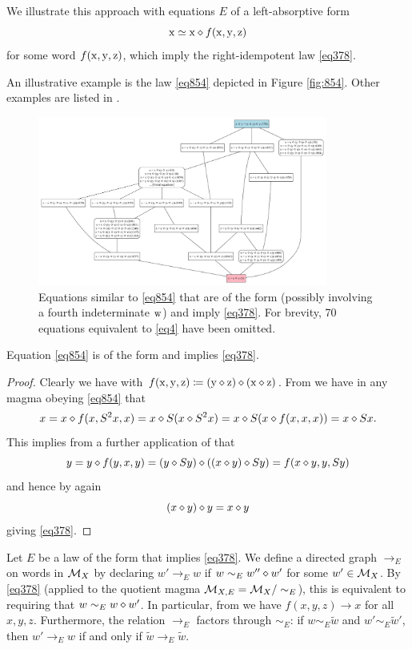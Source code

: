 We illustrate this approach with equations $E$ of a left-absorptive form
\begin{equation}\label{left-absorptive}
\mathrm{x} \simeq \mathrm{x} \diamond f(\mathrm{x},\mathrm{y},\mathrm{z})
\end{equation}
for some word $f(\mathrm{x},\mathrm{y},\mathrm{z})$, which imply the right-idempotent law \eqref{eq378}.

An illustrative example is the law \eqref{eq854} depicted in Figure \ref{fig:854}. Other examples are listed in .

\begin{figure}
  \centering
  \includegraphics[width=0.85\textwidth]{854-like.png}
  \caption{Equations similar to \eqref{eq854} that are of the form  (possibly involving a fourth indeterminate $\mathrm{w}$) and imply \eqref{eq378}.  For brevity, 70 equations equivalent to \eqref{eq4} have been omitted.}
  \label{fig:854-like}
  \end{figure}


\begin{lemma}\label{854} Equation \eqref{eq854} is of the form  and implies \eqref{eq378}.
\end{lemma}

\begin{proof}  Clearly we have  with $f(\mathrm{x},\mathrm{y},\mathrm{z}) \coloneqq (\mathrm{y} \diamond \mathrm{z}) \diamond (\mathrm{x} \diamond \mathrm{z})$.  From  we have in any magma obeying \eqref{eq854} that
$$x = x \diamond f(x,S^2 x,x) = x \diamond S(x \diamond S^2 x) = x \diamond S(x \diamond f(x,x,x)) = x \diamond Sx.$$
This implies from a further application of  that
$$ y = y \diamond f(y,x,y) = (y \diamond Sy) \diamond ((x \diamond y) \diamond Sy) = f(x \diamond y, y, Sy)$$
and hence by  again
$$ (x \diamond y) \diamond y = x \diamond y$$
giving \eqref{eq378}.
\end{proof}

Let $E$ be a law of the form  that implies \eqref{eq378}. We define a directed graph $\to_E$ on words in ${\mathcal{M}}_X$ by declaring $w' \to_E w$ if $w \sim_E w'' \diamond w'$ for some $w' \in {\mathcal{M}}_X$.  By \eqref{eq378} (applied to the quotient magma ${\mathcal{M}}_{X,E} = {\mathcal{M}}_X/\sim_E$), this is equivalent to requiring that $w \sim_E w \diamond w'$. In particular, from  we have $f(x,y,z) \to x$ for all $x,y,z$.  Furthermore, the relation $\to_E$ factors through $\sim_E$: if $w \sim_E \tilde w$ and $w' \sim_E \tilde w'$, then $w' \to_E w$ if and only if $\tilde w \to_E \tilde w$.


